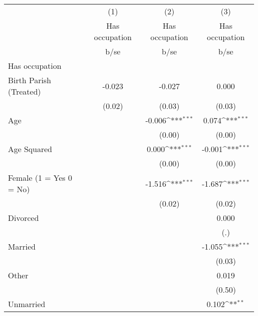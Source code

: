 {
\def\sym#1{\ifmmode^{#1}\else\(^{#1}\)\fi}
\begin{tabular}{l*{3}{c}}
\hline\hline
                    &\multicolumn{1}{c}{(1)}&\multicolumn{1}{c}{(2)}&\multicolumn{1}{c}{(3)}\\
                    &\multicolumn{1}{c}{Has occupation}&\multicolumn{1}{c}{Has occupation}&\multicolumn{1}{c}{Has occupation}\\
                    &        b/se         &        b/se         &        b/se         \\
\hline
Has occupation      &                     &                     &                     \\
Birth Parish (Treated)&      -0.023         &      -0.027         &       0.000         \\
                    &      (0.02)         &      (0.03)         &      (0.03)         \\
Age                 &                     &      -0.006\sym{***}&       0.074\sym{***}\\
                    &                     &      (0.00)         &      (0.00)         \\
Age Squared         &                     &       0.000\sym{***}&      -0.001\sym{***}\\
                    &                     &      (0.00)         &      (0.00)         \\
Female (1 = Yes 0 = No)&                     &      -1.516\sym{***}&      -1.687\sym{***}\\
                    &                     &      (0.02)         &      (0.02)         \\
Divorced            &                     &                     &       0.000         \\
                    &                     &                     &         (.)         \\
Married             &                     &                     &      -1.055\sym{***}\\
                    &                     &                     &      (0.03)         \\
Other               &                     &                     &       0.019         \\
                    &                     &                     &      (0.50)         \\
Unmarried           &                     &                     &       0.102\sym{**} \\

\end{tabular}}
